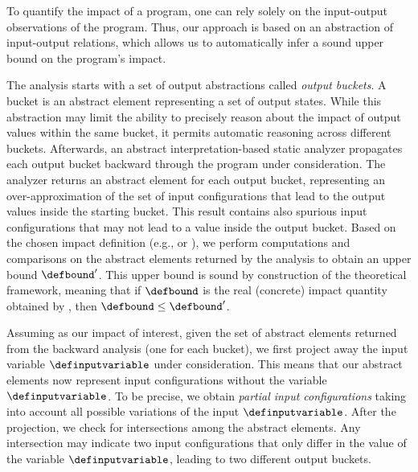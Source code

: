 To quantify the impact of a program, one can rely solely on the input-output observations of the program.
Thus, our approach is based on an abstraction of input-output relations, which allows us to automatically infer a sound upper bound on the program's impact.

The analysis starts with a set of output abstractions called \textit{output buckets}.
A bucket is an abstract element representing a set of output states.
While this abstraction may limit the ability to precisely reason about the impact of output values within the same bucket, it permits automatic reasoning across different buckets.
Afterwards, an abstract interpretation-based static analyzer propagates each output bucket backward through the program under consideration.
The analyzer returns an abstract element for each output bucket, representing an over-approximation of the set of input configurations that lead to the output values inside the starting bucket.
This result contains also spurious input configurations that may not lead to a value inside the output bucket.
Based on the chosen impact definition \impactwrappername{} (e.g., \rangename{} or \outcomesname), we perform computations and comparisons on the abstract elements returned by the analysis to obtain an upper bound $\defbound'$. This upper bound is sound by construction of the theoretical framework, meaning that if $\defbound$ is the real (concrete) impact quantity obtained by \impactwrappername, then $\defbound\le\defbound'$.

Assuming \rangename{} as our impact of interest, given the set of abstract elements returned from the backward analysis (one for each bucket), we first project away the input variable $\definputvariable$ under consideration.
This means that our abstract elements now represent input configurations without the variable $\definputvariable$.
To be precise, we obtain \textit{partial input configurations} taking into account all possible variations of the input $\definputvariable$.
After the projection, we check for intersections among the abstract elements.
Any intersection may indicate two input configurations that only differ in the value of the variable $\definputvariable$, leading to two different output buckets.

